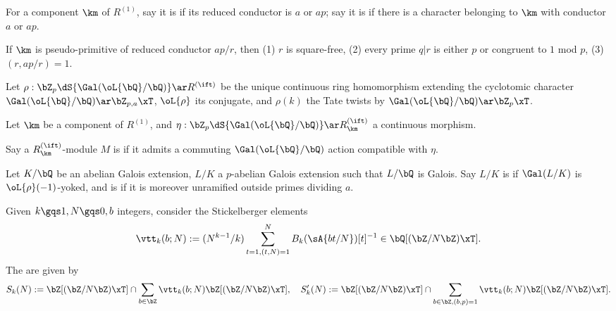 \documentclass[article, a4paper, twoside]{universal}
\begin{document}
\begin{cmt}
	\begin{dfn}
		For a component $\km$ of $R^{(1)}$, say it is  if its reduced conductor is $a$ or $ap$; say it is  if there is a character belonging to $\km$ with conductor $a$ or $ap$.

		If $\km$ is pseudo-primitive of reduced conductor $ap/r$, then (1) $r$ is square-free, (2) every prime $q|r$ is either $p$ or congruent to $1$ mod $p$, (3) $(r,ap/r)=1$.
	\end{dfn}

\end{cmt}

\begin{cmt}
	Let $\rho:\bZ_{p}\dS{\Gal(\oL{\bQ}/\bQ)}\ar R^{(\ift)}$ be the unique continuous ring homomorphism extending the cyclotomic character $\Gal(\oL{\bQ}/\bQ)\ar\bZ_{p,a}\xT$, $\oL{\rho}$ its conjugate, and $\rho(k)$ the Tate twists by $\Gal(\oL{\bQ}/\bQ)\ar\bZ_{p}\xT$.

	\begin{dfn}
		Let $\km$ be a component of $R^{(1)}$, and $\eta:\bZ_{p}\dS{\Gal(\oL{\bQ}/\bQ)}\ar R_{\km}^{(\ift)}$ a continuous morphism.

		Say a $R_{\km}^{(\ift)}$-module $M$ is  if it admits a commuting $\Gal(\oL{\bQ}/\bQ)$ action compatible with $\eta$.
	\end{dfn}

	\begin{dfn}[1.8~Definition]
		Let $K/\bQ$ be an abelian Galois extension, $L/K$ a $p$-abelian Galois extension such that $L/\bQ$ is Galois. Say $L/K$ is  if $\Gal(L/K)$ is $\oL{\rho}(-1)$-yoked, and is  if it is moreover unramified outside primes dividing $a$.
	\end{dfn}
\end{cmt}


\begin{cmt}

\begin{dfn}
	Given $k\gqs1,N\gqs0,b$ integers, consider the Stickelberger elements
	\[
		\vtt_{k}(b;N):=(N^{k-1}/k)\sum_{t=1,(t,N)=1}^{N}B_{k}(\sA{bt/N})[t]^{-1}\in\bQ[(\bZ/N\bZ)\xT].
	\]
	The  are given by
	\[
		S_{k}(N):=\bZ[(\bZ/N\bZ)\xT]\cap\sum_{b\in\bZ}\vtt_{k}(b;N)\bZ[(\bZ/N\bZ)\xT],\quad S_{k}'(N):=\bZ[(\bZ/N\bZ)\xT]\cap\sum_{b\in\bZ, (b,p)=1}\vtt_{k}(b;N)\bZ[(\bZ/N\bZ)\xT].
	\]
\end{dfn}
\end{cmt}
\end{document}
